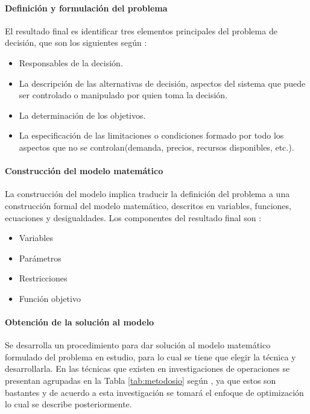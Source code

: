 \paragraph{Definición y formulación del problema}
El resultado final es identificar tres elementos principales del problema de decisión, que son los siguientes según : 
\begin{itemize}[noitemsep]
    \item Responsables de la decisión.
    \item La descripción de las alternativas de decisión, aspectos del sistema que puede ser controlado o manipulado por quien toma la decisión.
    \item La determinación de los objetivos.
    \item La especificación de las limitaciones o condiciones formado por todo los aspectos que no se controlan(demanda, precios, recursos disponibles, etc.).
\end{itemize}
\paragraph{Construcción del modelo matemático}
La construcción del modelo implica traducir la definición del problema a una construcción formal del modelo matemático, descritos en variables, funciones, ecuaciones y desigualdades. Los componentes del resultado final son \cite{CabreraGarcia2013IntroduccionYouTube}:
\begin{itemize}[noitemsep]
    \item Variables
    \item Parámetros
    \item Restricciones
    \item Función objetivo
\end{itemize}
\paragraph{Obtención de la solución al modelo}
Se desarrolla un procedimiento para dar solución al modelo matemático formulado del problema en estudio, para lo cual se tiene que elegir la técnica y desarrollarla. En las técnicas que existen en investigaciones de operaciones se presentan agrupadas en la Tabla \ref{tab:metodosio} según , ya que estos son bastantes y de acuerdo a esta investigación se tomará el enfoque de optimización lo cual se describe posteriormente.  

